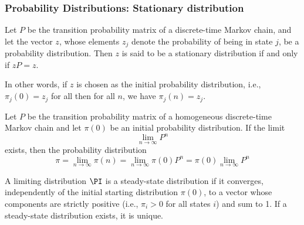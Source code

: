 \begin{frame}
    \frametitle{Probability Distributions: Stationary distribution}
        \begin{definition}
            Let $P$ be the transition probability matrix of a discrete-time Markov chain, and let 
            the vector $z$, whose elements $z_j$ denote the probability of being in state $j$, be a probability 
            distribution. Then $z$ is said to be a stationary distribution if and only if $zP = z$.
        \end{definition}

        In other words, if $z$ is chosen as the initial probability distribution, i.e., $\pi_j(0) = z_j$
        for all then for all $n$, we have {\color{red}$\pi_j(n) = z_j$}.
\end{frame}




\begin{frame}
        \begin{definition}
            Let $P$ be the transition probability matrix of a homogeneous discrete-time 
            Markov chain and let $\pi(0)$ be an initial probability distribution. If the limit
            $$\lim_{n \to\infty} P^n$$
            exists, then the probability distribution
            $$\pi = \lim_{n \to\infty}\pi(n) = \lim_{n \to\infty}\pi(0)P^n = \pi(0)\lim_{n \to\infty}P^n$$
        \end{definition}

        \begin{definition}
            A limiting distribution $\PI$ is a steady-state distribution if it converges, independently of 
            the initial starting distribution $\pi(0)$, to a vector whose components are strictly 
            positive (i.e., $\pi_i>0$ for all states $i$) and sum to 1. If a steady-state distribution 
            exists, it is unique.
        \end{definition}

\end{frame}



